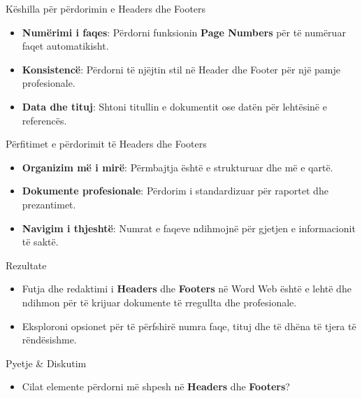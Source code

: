 \documentclass[
  ignorenonframetext,
]{beamer}
\providecommand{\tightlist}{%
  \setlength{\itemsep}{0pt}\setlength{\parskip}{0pt}}
\begin{document}
\begin{frame}{Këshilla për përdorimin e Headers dhe Footers}
\label{kuxebshilla-puxebr-puxebrdorimin-e-headers-dhe-footers}
\begin{itemize}
\item
  \textbf{Numërimi i faqes}: Përdorni funksionin \textbf{Page Numbers}
  për të numëruar faqet automatikisht.
\item
  \textbf{Konsistencë}: Përdorni të njëjtin stil në Header dhe Footer
  për një pamje profesionale.
\item
  \textbf{Data dhe tituj}: Shtoni titullin e dokumentit ose datën për
  lehtësinë e referencës.
\end{itemize}
\end{frame}

\begin{frame}{Përfitimet e përdorimit të Headers dhe Footers}
\label{puxebrfitimet-e-puxebrdorimit-tuxeb-headers-dhe-footers}
\begin{itemize}
\item
  \textbf{Organizim më i mirë}: Përmbajtja është e strukturuar dhe më e
  qartë.
\item
  \textbf{Dokumente profesionale}: Përdorim i standardizuar për raportet
  dhe prezantimet.
\item
  \textbf{Navigim i thjeshtë}: Numrat e faqeve ndihmojnë për gjetjen e
  informacionit të saktë.
\end{itemize}
\end{frame}

\begin{frame}{Rezultate}
\label{rezultate-3}
\begin{itemize}
\tightlist
\item
  Futja dhe redaktimi i \textbf{Headers} dhe \textbf{Footers} në Word
  Web është e lehtë dhe ndihmon për të krijuar dokumente të rregullta
  dhe profesionale.\\
\item
  Eksploroni opsionet për të përfshirë numra faqe, tituj dhe të dhëna të
  tjera të rëndësishme.
\end{itemize}
\end{frame}

\begin{frame}{Pyetje \& Diskutim}
\label{pyetje-diskutim-3}
\begin{itemize}
\tightlist
\item
  Cilat elemente përdorni më shpesh në \textbf{Headers} dhe
  \textbf{Footers}?
\end{itemize}
\end{frame}
\end{document}
